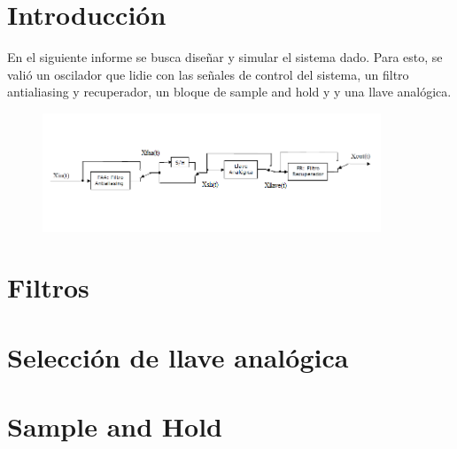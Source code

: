 







\tableofcontents
\newpage


\section{Introducción}

En el siguiente informe se busca diseñar y simular el sistema dado. Para esto, se valió un oscilador que lidie con las señales de control del sistema, un filtro antialiasing y recuperador, un bloque de sample and hold y y una llave analógica.

\begin{figure}[H]
\centering
\includegraphics[width = 0.9\textwidth]{Sistema.png}
\label{Sistema a implementar.}
\end{figure}

\section{Filtros}
	\label{Ejercicio-2}
	

\pagebreak
\section{Selección de llave analógica}
	\label{Ejercicio-3}
	

\pagebreak	
\section{Sample and Hold}
	\label{Ejercicio-4}
	
	
